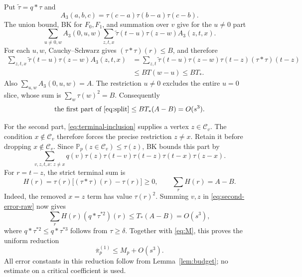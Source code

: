 \documentclass[11pt]{article}
\theoremstyle{definition}
\newcommand{\Pp}{\mathbb P_p}
\begin{document}
Put $\widetilde\tau=q*\tau$ and
\[
 A_3(a,b,c)=\tau(c-a)\tau(b-a)\tau(c-b).
\]
The union bound, BK for $F_0,F_1$, and summation over $v$ give for the
$u\ne0$ part
\begin{equation}\label{eq:first-error-raw}
 \sum_{u\ne0,w} A_3(0,u,w)
 \sum_{z,t,x}\widetilde\tau(t-u)\tau(z-w)A_3(z,t,x).
\end{equation}
For each $u,w$, Cauchy--Schwarz gives
$(\tau*\tau)(r)\le B$, and therefore
\begin{align*}
 \sum_{z,t,x}\widetilde\tau(t-u)\tau(z-w)A_3(z,t,x)
 &=\sum_{z,t}\widetilde\tau(t-u)\tau(z-w)
     \tau(t-z)(\tau*\tau)(t-z)\\
 &\le B T(w-u)\le BT_*.
\end{align*}
Also $\sum_{u,w}A_3(0,u,w)=A$. The restriction $u\ne0$ excludes the
entire $u=0$ slice, whose sum is $\sum_w\tau(w)^2=B$. Consequently
\begin{equation}\label{eq:first-error}
 \text{the first part of \eqref{eq:split}}
 \le BT_*(A-B)=O(s^3).
\end{equation}

For the second part, \eqref{eq:terminal-inclusion} supplies a vertex
$z\in\mathcal C_v$. The condition $x\notin\mathcal C_v$ therefore
forces the precise restriction $z\ne x$. Retain it before dropping
$x\notin\mathcal C_v$. Since
$\Pp(z\in\mathcal C_v)\le\tau(z)$, BK bounds this part by
\begin{equation}\label{eq:second-error-raw}
 \sum_{v,z,t,x:\,z\ne x}q(v)\tau(z)\tau(t-v)
          \tau(t-z)\tau(t-x)\tau(z-x).
\end{equation}
For $r=t-z$, the strict terminal sum is
\begin{equation}\label{eq:hbad}
 H(r)=\tau(r)\big[(\tau*\tau)(r)-\tau(r)\big]\ge0,
 \qquad \sum_rH(r)=A-B.
\end{equation}
Indeed, the removed $x=z$ term has value $\tau(r)^2$.
Summing $v,z$ in \eqref{eq:second-error-raw} now gives
\begin{equation}\label{eq:second-error}
 \sum_r H(r)(q*\tau^{*2})(r)
 \le T_*(A-B)=O(s^3),
\end{equation}
where $q*\tau^{*2}\le q*\tau^{*3}$ follows from $\tau\ge\delta$.
Together with \eqref{eq:M}, this proves the uniform reduction
\begin{equation}\label{eq:pi1-M}
 \overline\pi_p^{(1)}\le M_p+O(s^3).
\end{equation}
All error constants in this reduction follow from
Lemma~\ref{lem:budget}; no estimate on a critical coefficient is used.
\end{document}
